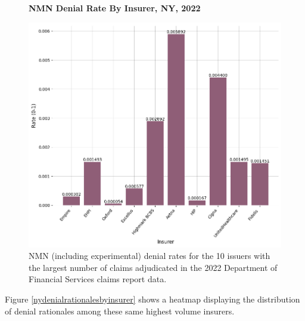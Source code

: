 \documentclass[12pt, a4paper,twoside]{report}
\theoremstyle{plain} %
\theoremstyle{definition} %
\theoremstyle{remark} %
\numberwithin{equation}{chapter}
\begin{document}
		\clearpage
		
		\begin{figure}[h!]
			\centering
			\textbf{NMN Denial Rate By Insurer, NY, 2022}\par\medskip
			\includegraphics[width=\columnwidth]{images/ny_claim_reports/nmn_denial_rate_by_insurer.png}
			\caption{NMN (including experimental) denial rates for the 10 issuers with the largest number of claims adjudicated in the 2022 Department of Financial Services claims report data.}
			\label{nyinsurernmndenialrates}
		\end{figure}
	
		
		Figure \ref{nydenialrationalesbyinsurer} shows a heatmap displaying the distribution of denial rationales among these same highest volume insurers.
		
\end{document}
